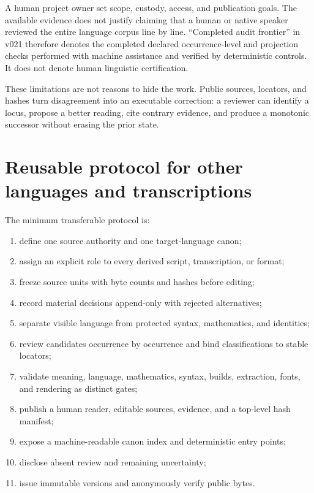 \documentclass[11pt]{article}
\begin{document}
A human project owner set scope, custody, access, and publication goals. The available evidence does not justify claiming that a human or native speaker reviewed the entire language corpus line by line. ``Completed audit frontier'' in v021 therefore denotes the completed declared occurrence-level and projection checks performed with machine assistance and verified by deterministic controls. It does not denote human linguistic certification.

These limitations are not reasons to hide the work. Public sources, locators, and hashes turn disagreement into an executable correction: a reviewer can identify a locus, propose a better reading, cite contrary evidence, and produce a monotonic successor without erasing the prior state.

\section{Reusable protocol for other languages and transcriptions}

The minimum transferable protocol is:

\begin{enumerate}
\item define one source authority and one target-language canon;
\item assign an explicit role to every derived script, transcription, or format;
\item freeze source units with byte counts and hashes before editing;
\item record material decisions append-only with rejected alternatives;
\item separate visible language from protected syntax, mathematics, and identities;
\item review candidates occurrence by occurrence and bind classifications to stable locators;
\item validate meaning, language, mathematics, syntax, builds, extraction, fonts, and rendering as distinct gates;
\item publish a human reader, editable sources, evidence, and a top-level hash manifest;
\item expose a machine-readable canon index and deterministic entry points;
\item disclose absent review and remaining uncertainty;
\item issue immutable versions and anonymously verify public bytes.
\end{enumerate}
\end{document}
